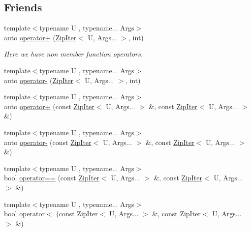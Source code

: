 \subsection*{Friends}
\begin{DoxyCompactItemize}
\item 
{\footnotesize template$<$typename U , typename... Args$>$ }\\auto \hyperlink{classit_1_1ZipIter_adf4b1b11e1b917d1b9db0f208e203569}{operator+} (\hyperlink{classit_1_1ZipIter}{Zip\+Iter}$<$ U, Args... $>$, int)
\begin{DoxyCompactList}\small\item\em Here we have non member function operators. \end{DoxyCompactList}\item 
{\footnotesize template$<$typename U , typename... Args$>$ }\\auto \hyperlink{classit_1_1ZipIter_a81664fc13b1b2fae18d5f67d1785fa6d}{operator-\/} (\hyperlink{classit_1_1ZipIter}{Zip\+Iter}$<$ U, Args... $>$, int)
\item 
{\footnotesize template$<$typename U , typename... Args$>$ }\\auto \hyperlink{classit_1_1ZipIter_a308ae9c8735339c2f8d68965d19e88c2}{operator+} (const \hyperlink{classit_1_1ZipIter}{Zip\+Iter}$<$ U, Args... $>$ \&, const \hyperlink{classit_1_1ZipIter}{Zip\+Iter}$<$ U, Args... $>$ \&)
\item 
{\footnotesize template$<$typename U , typename... Args$>$ }\\auto \hyperlink{classit_1_1ZipIter_a943ae2b69cad6c288dbf0618ec34d55a}{operator-\/} (const \hyperlink{classit_1_1ZipIter}{Zip\+Iter}$<$ U, Args... $>$ \&, const \hyperlink{classit_1_1ZipIter}{Zip\+Iter}$<$ U, Args... $>$ \&)
\item 
{\footnotesize template$<$typename U , typename... Args$>$ }\\bool \hyperlink{classit_1_1ZipIter_a6ca0ad885ca34a155bf84e16d81d0298}{operator==} (const \hyperlink{classit_1_1ZipIter}{Zip\+Iter}$<$ U, Args... $>$ \&, const \hyperlink{classit_1_1ZipIter}{Zip\+Iter}$<$ U, Args... $>$ \&)
\item 
{\footnotesize template$<$typename U , typename... Args$>$ }\\bool \hyperlink{classit_1_1ZipIter_a39b41cd2af33a88e256ad4451d749330}{operator$<$} (const \hyperlink{classit_1_1ZipIter}{Zip\+Iter}$<$ U, Args... $>$ \&, const \hyperlink{classit_1_1ZipIter}{Zip\+Iter}$<$ U, Args... $>$ \&)
\end{DoxyCompactItemize}


